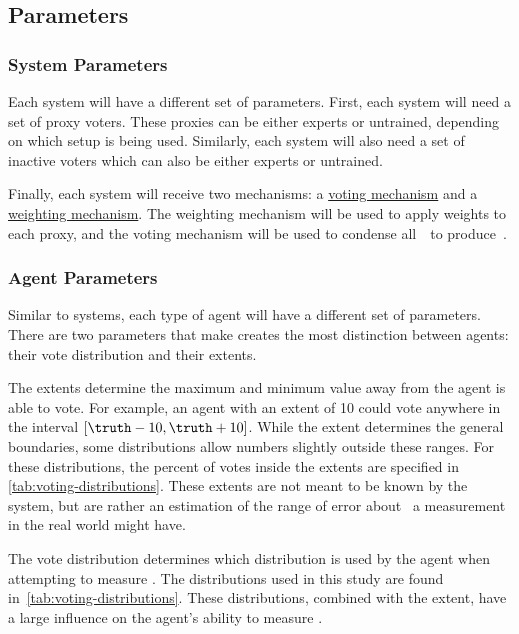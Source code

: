 
\subsection{Parameters}\label{subsec:parameters}

\subsubsection{System Parameters}\label{subsubsec:system-parameters}
Each system will have a different set of parameters.
First, each system will need a set of proxy voters.
These proxies can be either experts or untrained, depending on which setup is
being used.
Similarly, each system will also need a set of inactive voters which can also
be either experts or untrained.

Finally, each system will receive two mechanisms: a
\hyperref[subsec:voting-mechanisms]{voting mechanism} and a
\hyperref[subsec:weighting-mechanisms]{weighting mechanism}.
The weighting mechanism will be used to apply weights to each proxy, and the
voting mechanism will be used to condense all~\agenttruth\ to
produce~\systemtruth.

\subsubsection{Agent Parameters}\label{subsubsec:agent-parameters}
Similar to systems, each type of agent will have a different set of parameters.
There are two parameters that make creates the most distinction between
agents: their vote distribution and their extents.

The extents determine the maximum and minimum value away from \truth the
agent is able to vote.
For example, an agent with an extent of 10 could vote anywhere in the
interval $[\truth - 10, \truth + 10]$.
While the extent determines the general boundaries, some distributions allow
numbers slightly outside these ranges.
For these distributions, the percent of votes inside the extents are
specified in \autoref{tab:voting-distributions}.
These extents are not meant to be known by the system, but are rather an
estimation of the range of error about \truth\ a measurement in the real world
might have.

The vote distribution determines which distribution is used by the agent when
attempting to measure \truth.
The distributions used in this study are found
in~\autoref{tab:voting-distributions}.
These distributions, combined with the extent, have a large influence on the
agent's ability to measure \truth.

